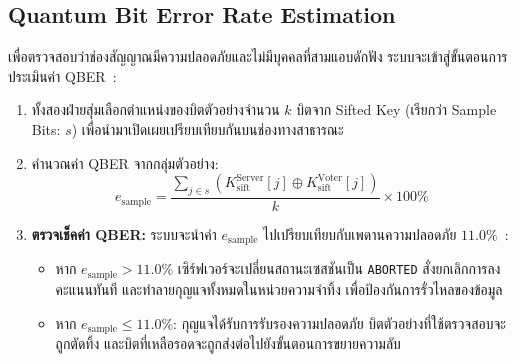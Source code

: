 \subsection{Quantum Bit Error Rate Estimation}
เพื่อตรวจสอบว่าช่องสัญญาณมีความปลอดภัยและไม่มีบุคคลที่สามแอบดักฟัง ระบบจะเข้าสู่ขั้นตอนการประเมินค่า QBER~\cite{gisin_qkd_review}:
\begin{enumerate}
    \item ทั้งสองฝ่ายสุ่มเลือกตำแหน่งของบิตตัวอย่างจำนวน $k$ บิตจาก Sifted Key (เรียกว่า Sample Bits: $s$) เพื่อนำมาเปิดเผยเปรียบเทียบกันบนช่องทางสาธารณะ
    \item คำนวณค่า QBER จากกลุ่มตัวอย่าง:
    \begin{equation}
        e_{\text{sample}} = \frac{\sum_{j\in s}^{} (K_{\text{sift}}^{\text{Server}}[j] \oplus K_{\text{sift}}^{\text{Voter}}[j])}{k} \times 100\%
    \end{equation}
    \item \textbf{ตรวจเช็คค่า QBER:} ระบบจะนำค่า $e_{\text{sample}}$ ไปเปรียบเทียบกับเพดานความปลอดภัย $11.0\%$~\cite{shor_preskill_2000}:
    \begin{itemize}
        \item หาก $e_{\text{sample}} > 11.0\%$  เซิร์ฟเวอร์จะเปลี่ยนสถานะเซสชันเป็น \texttt{ABORTED} สั่งยกเลิกการลงคะแนนทันที และทำลายกุญแจทั้งหมดในหน่วยความจำทิ้ง เพื่อป้องกันการรั่วไหลของข้อมูล
        \item หาก $e_{\text{sample}} \le 11.0\%$: กุญแจได้รับการรับรองความปลอดภัย บิตตัวอย่างที่ใช้ตรวจสอบจะถูกตัดทิ้ง และบิตที่เหลือรอดจะถูกส่งต่อไปยังขั้นตอนการขยายความลับ
    \end{itemize}
\end{enumerate}

